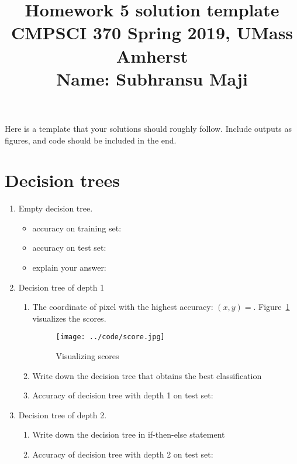 \documentclass[10pt,letterpaper]{article}
\title{
  Homework 5 solution template\\
  \Large{CMPSCI 370 Spring 2019, UMass Amherst} \\
  \Large{Name: Subhransu Maji} \\
}
\date{}
\begin{document}
\maketitle

\renewcommand\thesubsection{\thesection.\alph{subsection}}

Here is a template that your solutions should roughly follow. Include outputs as figures, and code should be included in the end.


\section{Decision trees}
\begin{enumerate}
\item Empty decision tree. 
 
\begin{itemize}
\item accuracy on training set: \underline{\hspace{2cm}}
\item accuracy on test set: \underline{\hspace{2cm}}
\item explain your answer:
\end{itemize}
\vspace{1.in}

\item Decision tree of depth 1
\begin{enumerate}
\item The coordinate of pixel with the highest accuracy: $(x, y)=$\underline{\hspace{2cm}}. Figure~\ref{fig:viz} visualizes the scores.
\begin{figure}[h]
\centering
\texttt{[image: ../code/score.jpg]}
\caption{\label{fig:viz}Visualizing scores}
\end{figure}
\item Write down the decision tree that obtains the best classification
\vspace{2in}
\item Accuracy of decision tree with depth 1 on test set: \underline{\hspace{2cm}}
\vspace{0.3in}
\end{enumerate}

\item Decision tree of depth 2.
\begin{enumerate}
\item Write down the decision tree in if-then-else statement
\vspace{4in}
\item Accuracy of decision tree with depth 2 on test set: \underline{\hspace{2cm}}
\end{enumerate}

\end{enumerate}
\newpage
\end{document}
